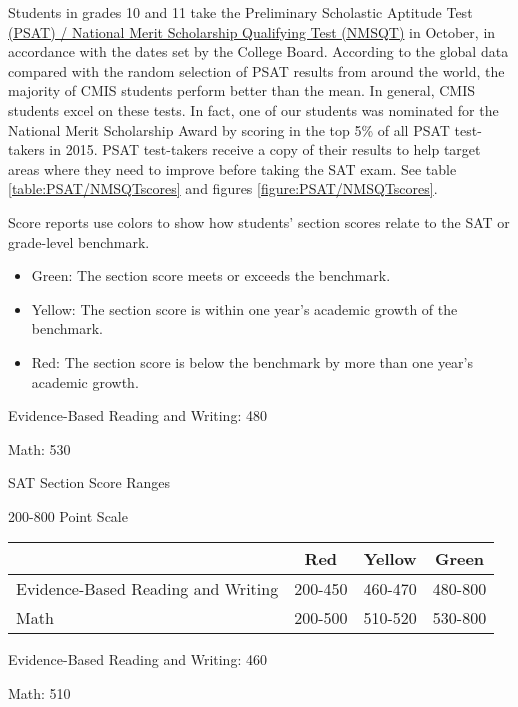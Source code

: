 Students in grades 10 and 11 take the Preliminary Scholastic Aptitude Test\href{https://drive.google.com/drive/folders/0B71\_pYxcTLo-VGNkQlZtTFlIQlE}{ (PSAT) / National Merit Scholarship Qualifying Test (NMSQT)} in October, in accordance with the dates set by the College Board. According to the global data compared with the random selection of PSAT results from around the world, the majority of CMIS students perform better than the mean. In general, CMIS students excel on these tests.  In fact, one of our students was nominated for the National Merit Scholarship Award by scoring in the top 5\% of all PSAT test-takers in 2015.  PSAT test-takers receive a copy of their results to help target areas where they need to improve before taking the SAT exam. See table \ref{table:PSAT/NMSQTscores} and figures \ref{figure:PSAT/NMSQTscores}.


Score reports use colors to show how students’ section scores relate to the SAT or grade-level benchmark.
\begin{itemize}
\item Green: The section score meets or exceeds the benchmark.
\item Yellow: The section score is within one year’s academic growth of the benchmark.
\item Red: The section score is below the benchmark by more than one year’s academic growth.
\end{itemize}


Evidence-Based Reading and Writing: 480

Math: 530

SAT Section Score Ranges

200-800 Point Scale
 
\begin{tabular}{|l|c|c|c|}
\hline
  &
Red &
Yellow &
Green \\
\hline
Evidence-Based  
Reading and Writing &
200-450 &
460-470 &
480-800 \\
\hline
Math  &
200-500 &
510-520 &
530-800 \\
\hline
\end{tabular}


Evidence-Based Reading and Writing: 460

Math: 510

